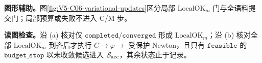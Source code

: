 \documentclass[UTF8,a4paper,11pt,openany]{ctexbook}
\begin{document}
\setcounter{page}{691}
\setcounter{chapter}{35}
\setcounter{section}{4}
\setcounter{figure}{6}
\pagestyle{headings}
\textbf{图形辅助。}图\ref{fig:V5-C06-variational-updates}区分局部 $\mathrm{LocalOK}_m$ 门与全语料提交门；局部预算或失败不进入 C/M 步。

\FloatBarrier
\noindent\textbf{读图检查。}沿 (a) 核对仅 $\mathtt{completed}/\mathtt{converged}$ 形成 $\mathrm{LocalOK}_m$；沿 (b) 核对全部 $\mathrm{LocalOK}_m$ 到齐后才执行 $C\to\varphi\to$ 受保护 Newton，且只有 $\mathtt{feasible}$ 的 $\mathtt{budget\_stop}$ 以未收敛候选进入 $\mathcal S_{\rm acc}$，其余状态止于记录。\par
\end{document}
